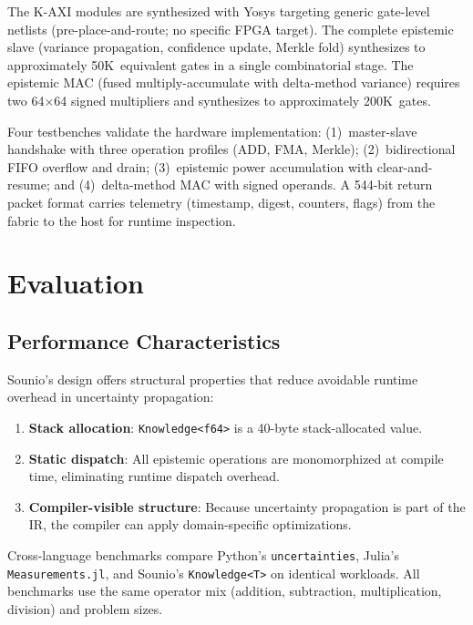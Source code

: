 \documentclass[journal]{IEEEtran}
\begin{document}
The K-AXI modules are synthesized with Yosys targeting generic gate-level
netlists (pre-place-and-route; no specific FPGA target). The complete
epistemic slave (variance propagation, confidence update, Merkle fold)
synthesizes to approximately 50K~equivalent gates in a single
combinatorial stage. The epistemic MAC (fused multiply-accumulate with
delta-method variance) requires two 64$\times$64 signed multipliers and
synthesizes to approximately 200K~gates.

Four testbenches validate the hardware implementation:
(1)~master-slave handshake with three operation profiles (ADD, FMA, Merkle);
(2)~bidirectional FIFO overflow and drain;
(3)~epistemic power accumulation with clear-and-resume; and
(4)~delta-method MAC with signed operands.
A 544-bit return packet format carries telemetry (timestamp, digest,
counters, flags) from the fabric to the host for runtime inspection.

\section{Evaluation}
\label{sec:evaluation}

\subsection{Performance Characteristics}

Sounio's design offers structural properties that reduce avoidable runtime
overhead in uncertainty propagation:
\begin{enumerate}
  \item \textbf{Stack allocation}: \texttt{Knowledge<f64>} is a 40-byte
        stack-allocated value.
  \item \textbf{Static dispatch}: All epistemic operations are
        monomorphized at compile time, eliminating runtime dispatch
        overhead.
  \item \textbf{Compiler-visible structure}: Because uncertainty
        propagation is part of the IR, the compiler can apply
        domain-specific optimizations.
\end{enumerate}

Cross-language benchmarks compare Python's \texttt{uncertainties},
Julia's \texttt{Measurements.jl}, and Sounio's \texttt{Knowledge<T>}
on identical workloads. All benchmarks use the same operator mix
(addition, subtraction, multiplication, division) and problem sizes.
\end{document}
